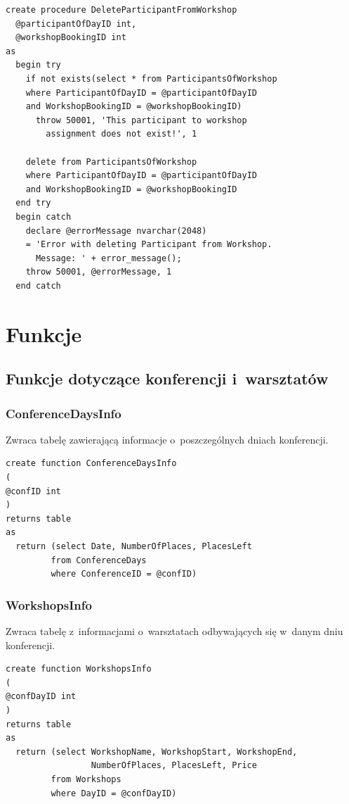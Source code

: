 \documentclass[12pt, a4paper]{mwrep}
\begin{document}
\begin{lstlisting}
create procedure DeleteParticipantFromWorkshop
  @participantOfDayID int,
  @workshopBookingID int
as
  begin try
    if not exists(select * from ParticipantsOfWorkshop
    where ParticipantOfDayID = @participantOfDayID
    and WorkshopBookingID = @workshopBookingID)
      throw 50001, 'This participant to workshop 
        assignment does not exist!', 1

    delete from ParticipantsOfWorkshop
    where ParticipantOfDayID = @participantOfDayID
    and WorkshopBookingID = @workshopBookingID
  end try
  begin catch
    declare @errorMessage nvarchar(2048)
    = 'Error with deleting Participant from Workshop. 
      Message: ' + error_message();
    throw 50001, @errorMessage, 1
  end catch
\end{lstlisting}

\chapter{Funkcje}

\section{Funkcje dotyczące konferencji i~warsztatów}

\subsection{ConferenceDaysInfo}

\noindent Zwraca tabelę zawierającą informacje o~poszczególnych dniach konferencji.

\begin{lstlisting}
create function ConferenceDaysInfo
(
@confID int
)
returns table
as
  return (select Date, NumberOfPlaces, PlacesLeft
         from ConferenceDays
         where ConferenceID = @confID)
\end{lstlisting}

\subsection{WorkshopsInfo}

\noindent Zwraca tabelę z~informacjami o~warsztatach odbywających się w~danym dniu konferencji.

\begin{lstlisting}
create function WorkshopsInfo
(
@confDayID int
)
returns table
as
  return (select WorkshopName, WorkshopStart, WorkshopEnd, 
                 NumberOfPlaces, PlacesLeft, Price
         from Workshops
         where DayID = @confDayID)
\end{lstlisting}
\end{document}
